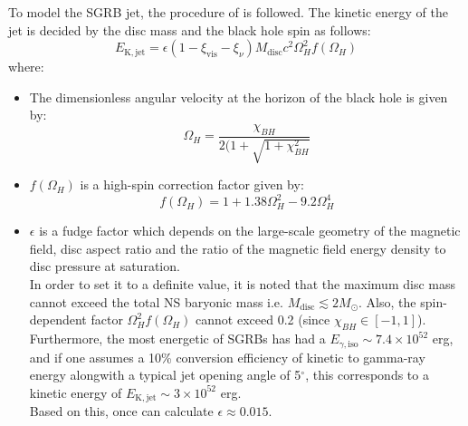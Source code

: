     To model the SGRB jet, the procedure of \cite{zhu_2020} is followed. The
    kinetic energy of the jet is decided by the disc mass and the black hole spin as
    follows:
    \begin{equation}
        E_{\mathrm{K, jet}} =
            \epsilon(1 - \xi_{\mathrm{vis}} - \xi_{\nu})
            M_{\mathrm{disc}} c^2 \Omega_H^2 f(\Omega_H)
        \label{eq:e_kin_jet}
    \end{equation}
    where:

    \begin{itemize}

        \item The dimensionless angular velocity at the horizon of the black hole is
            given by:
            \begin{equation}
                \Omega_H = \dfrac{\chi_{BH}}{2(1 + \sqrt{1 + \chi_{BH}^2}}
            \end{equation}

        \item $f(\Omega_H)$ is a high-spin correction factor given by:
            \begin{equation}
               f(\Omega_H) = 1 + 1.38\Omega_H^2 - 9.2 \Omega_H^4
               \label{eq:Omega_h}
            \end{equation}
        \item $\epsilon$ is a fudge factor which depends on the large-scale geometry of
            the magnetic field, disc aspect ratio and the ratio of the magnetic field
            energy density to disc pressure at saturation.\\ In order to set it to a
            definite value, it is noted that the maximum disc mass cannot exceed the
            total NS baryonic mass i.e. $M_{\mathrm{disc}} \lesssim 2M_\odot$. Also, the
            spin-dependent factor $\Omega_H^2f(\Omega_H)$ cannot exceed 0.2 (since
            $\chi_{BH} \in [-1, 1]$). Furthermore, the most energetic of SGRBs has had a
            $E_{\gamma, \mathrm{iso}} \sim 7.4 \times 10^{52}$ erg, and if one assumes a
            10\% conversion efficiency of kinetic to gamma-ray energy alongwith a
            typical jet opening angle of 5$^{\circ}$, this corresponds to a kinetic
            energy of $E_{\mathrm{K, jet}} \sim 3 \times 10^{52}$ erg.\\
            Based on this, once can calculate $\boxed{\epsilon \approx 0.015}$.

    \end{itemize}

